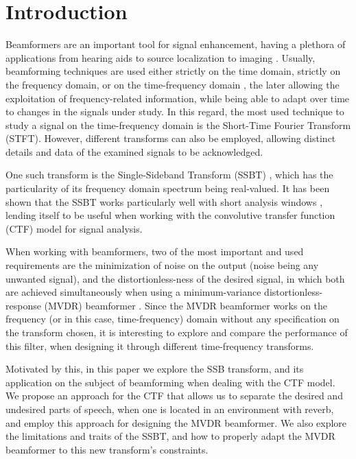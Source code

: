 \section{Introduction}
\label{sec:introduction}

Beamformers are an important tool for signal enhancement, having a plethora of applications from hearing aids \cite{lobato_worst-case-optimization_2020} to source localization \cite{chen_source_2002} to imaging \cite{lu_biomedical_1994,nguyen_minimum_2017}. Usually, beamforming techniques are used either strictly on the time domain, strictly on the frequency domain, or on the time-frequency domain \cite{benesty_fundamentals_2018}, the later allowing the exploitation of frequency-related information, while being able to adapt over time to changes in the signals under study. In this regard, the most used technique to study a signal on the time-frequency domain is the Short-Time Fourier Transform (STFT). However, different transforms can also be employed, allowing distinct details and data of the examined signals to be acknowledged.

One such transform is the Single-Sideband Transform (SSBT) \cite{crochiere_multirate_1983,oyzerman_speech_2012}, which has the particularity of its frequency domain spectrum being real-valued. It has been shown that the SSBT works particularly well with short analysis windows \cite{crochiere_multirate_1983}, lending itself to be useful when working with the convolutive transfer function (CTF) model \cite{talmon_relative_2009} for signal analysis.

When working with beamformers, two of the most important and used requirements are the minimization of noise on the output (noise being any unwanted signal), and the distortionless-ness of the desired signal, in which both are achieved simultaneously when using a minimum-variance distortionless-response (MVDR) beamformer \cite{capon_high-resolution_1969,erdogan_improved_2016}. Since the MVDR beamformer works on the frequency (or in this case, time-frequency) domain without any specification on the transform chosen, it is interesting to explore and compare the performance of this filter, when designing it through different time-frequency transforms.

Motivated by this, in this paper we explore the SSB transform, and its application on the subject of beamforming when dealing with the CTF model. We propose an approach for the CTF that allows us to separate the desired and undesired parts of speech, when one is located in an environment with reverb, and employ this approach for designing the MVDR beamformer. We also explore the limitations and traits of the SSBT, and how to properly adapt the MVDR beamformer to this new transform's constraints.

